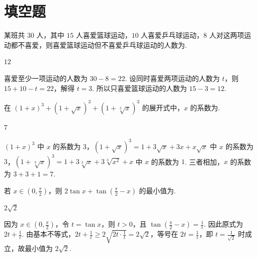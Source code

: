 \section{填空题}

\begin{problem}
某班共 \(30\) 人，其中 \(15\) 人喜爱篮球运动，\(10\) 人喜爱乒乓球运动，\(8\) 人对这两项运动都不喜爱，则喜爱篮球运动但不喜爱乒乓球运动的人数为\fillinblank{}.
\end{problem}

\begin{answer}
\(12\)
\end{answer}

\begin{solution}
喜爱至少一项运动的人数为 \(30-8=22\). 设同时喜爱两项运动的人数为 \(t\)，则 \(15+10-t=22\)，解得 \(t=3\). 所以只喜爱篮球运动的人数为 \(15-3=12\).
\end{solution}

\begin{problem}
在 \((1 + x)^{3} + (1 + \sqrt{x})^{3} + (1 + \sqrt[3]{x})^{3}\) 的展开式中，\(x\) 的系数为\fillinblank{}.
\end{problem}

\begin{answer}
\(7\)
\end{answer}

\begin{solution}
\((1+x)^3\) 中 \(x\) 的系数为 \(3\)，\((1+\sqrt{x})^3=1+3\sqrt{x}+3x+x\sqrt{x}\) 中 \(x\) 的系数为 \(3\)，\((1+\sqrt[3]{x})^3=1+3\sqrt[3]{x}+3\sqrt[3]{x^2}+x\) 中 \(x\) 的系数为 \(1\). 三者相加，\(x\) 的系数为 \(3+3+1=7\).
\end{solution}

\begin{problem}
若 \(x \in \left(0, \frac{\pi}{2}\right)\)，则 \(2\tan x + \tan \left(\frac{\pi}{2} - x\right)\) 的最小值为\fillinblank{}.
\end{problem}

\begin{answer}
\(2\sqrt{2}\)
\end{answer}

\begin{solution}
因为 \(x\in\left(0,\frac{\pi}{2}\right)\)，令 \(t=\tan x\)，则 \(t>0\)，且 \(\tan\left(\frac{\pi}{2}-x\right)=\frac1t\). 因此原式为 \(2t+\frac1t\). 由基本不等式，\(2t+\frac1t\geqslant2\sqrt{2t\cdot\frac1t}=2\sqrt2\)，等号在 \(2t=\frac1t\)，即 \(t=\frac1{\sqrt2}\) 时成立，故最小值为 \(2\sqrt2\).
\end{solution}

